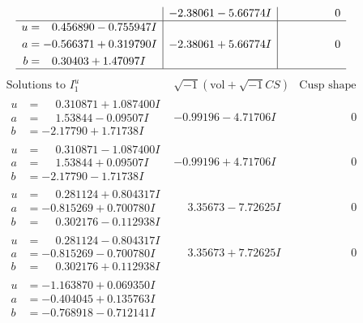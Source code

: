 \documentclass[1p]{elsarticle_modified}
\theoremstyle{definition}
\newcommand{\I}{\sqrt{-1}}
\begin{document}
$$\begin{array}{c|c|c}
 & -2.38061 - 5.66774 I & \phantom{-0.000000 } 0 \\ \hline\begin{aligned}
u &= \phantom{-}0.456890 - 0.755947 I \\
a &= -0.566371 + 0.319790 I \\
b &= \phantom{-}0.30403 + 1.47097 I\end{aligned}
 & -2.38061 + 5.66774 I & \phantom{-0.000000 } 0\\
 \hline 
 \end{array}$$\newpage$$\begin{array}{c|c|c}  
\text{Solutions to }I^u_{1}& \I (\text{vol} + \sqrt{-1}CS) & \text{Cusp shape}\\
 \hline 
\begin{aligned}
u &= \phantom{-}0.310871 + 1.087400 I \\
a &= \phantom{-}1.53844 - 0.09507 I \\
b &= -2.17790 + 1.71738 I\end{aligned}
 & -0.99196 - 4.71706 I & \phantom{-0.000000 } 0 \\ \hline\begin{aligned}
u &= \phantom{-}0.310871 - 1.087400 I \\
a &= \phantom{-}1.53844 + 0.09507 I \\
b &= -2.17790 - 1.71738 I\end{aligned}
 & -0.99196 + 4.71706 I & \phantom{-0.000000 } 0 \\ \hline\begin{aligned}
u &= \phantom{-}0.281124 + 0.804317 I \\
a &= -0.815269 + 0.700780 I \\
b &= \phantom{-}0.302176 - 0.112938 I\end{aligned}
 & \phantom{-}3.35673 - 7.72625 I & \phantom{-0.000000 } 0 \\ \hline\begin{aligned}
u &= \phantom{-}0.281124 - 0.804317 I \\
a &= -0.815269 - 0.700780 I \\
b &= \phantom{-}0.302176 + 0.112938 I\end{aligned}
 & \phantom{-}3.35673 + 7.72625 I & \phantom{-0.000000 } 0 \\ \hline\begin{aligned}
u &= -1.163870 + 0.069350 I \\
a &= -0.404045 + 0.135763 I \\
b &= -0.768918 - 0.712141 I\end{aligned}

\end{array}$$
\end{document}
